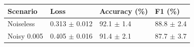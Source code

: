 \begin{tabular}{llll}
\toprule
Scenario & Loss & Accuracy (\%) & F1 (\%) \\
\midrule
Noiseless & 0.313 $\pm$ 0.012 & 92.1 $\pm$ 1.4 & 88.8 $\pm$ 2.4 \\
Noisy 0.005 & 0.405 $\pm$ 0.016 & 91.4 $\pm$ 2.1 & 87.7 $\pm$ 3.7 \\
\bottomrule
\end{tabular}
